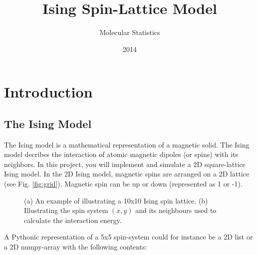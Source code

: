 \documentclass{article}
\title{Ising Spin-Lattice Model}
\author{Molecular Statistics}
\date{2014}
\begin{document}


\maketitle

\section{Introduction}

\subsection{The Ising Model}

The Ising model is a mathematical representation of a magnetic solid.
The Ising model decribes the interaction of atomic magnetic dipoles (or spins) with its neighbors.
In this project, you will implement and simulate a 2D square-lattice Ising model.
In the 2D Ising model, magnetic spins are arranged on a 2D lattice (see Fig. \ref{fig:grid}).
Magnetic spin can be up or down (represented as 1 or -1). 

\begin{figure}[h!]
  \centering
  \qquad %
  \qquad %
  \qquad %
  \caption{
    (a) An example of illustrating a 10x10 Ising spin lattice.
    (b) Illustrating the spin system $(x,y)$ and its neighbours used to calculate
    the interaction energy.
  }
\end{figure}

A Pythonic representation of a 5x5 spin-system could for instance be a 2D list or a 2D numpy-array with the following contents:
\end{document}
